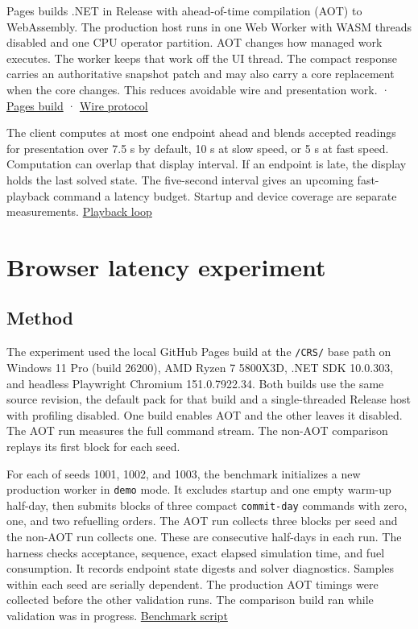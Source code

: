 \documentclass[11pt,letterpaper]{article}
\begin{document}
Pages builds .NET in Release with ahead-of-time compilation (AOT) to WebAssembly. The
production host runs in one Web Worker with WASM threads disabled and one CPU operator
partition. AOT changes how managed work executes. The worker keeps that work off the UI
thread. The compact response carries an authoritative snapshot patch and may also carry
a core replacement when the core changes. This reduces avoidable wire and presentation
work. \cite{ref-6} ·
\href{https://github.com/hkkho/CRS/blob/4341ae8881f5827988c3d8b1859aa9e8f13cd8a6/.github/workflows/deploy-candu-playtest.yml}{Pages
build} ·
\href{https://github.com/hkkho/CRS/blob/4341ae8881f5827988c3d8b1859aa9e8f13cd8a6/docs/spec/browser-playtest-protocol-v2.md}{Wire
protocol}

The client computes at most one endpoint ahead and blends accepted readings for
presentation over 7.5 s by default, 10 s at slow speed, or 5 s at fast speed.
Computation can overlap that display interval. If an endpoint is late, the display holds
the last solved state. The five-second interval gives an upcoming fast-playback command
a latency budget. Startup and device coverage are separate measurements.
\href{https://github.com/hkkho/CRS/blob/4341ae8881f5827988c3d8b1859aa9e8f13cd8a6/web/candu-playtest/src/DemoLoop.ts}{Playback
loop}

\section{Browser latency experiment}\label{sec:latency}

\subsection{Method}\label{method}

The experiment used the local GitHub Pages build at the \texttt{/CRS/} base path on
Windows 11 Pro (build 26200), AMD Ryzen 7 5800X3D, .NET SDK 10.0.303, and headless
Playwright Chromium 151.0.7922.34. Both builds use the same source revision, the default
pack for that build and a single-threaded Release host with profiling disabled. One build enables
AOT and the other leaves it disabled. The AOT run measures the full command stream. The
non-AOT comparison replays its first block for each seed.

For each of seeds 1001, 1002, and 1003, the benchmark initializes a new production
worker in \texttt{demo} mode. It excludes startup and one empty warm-up half-day, then
submits blocks of three compact \texttt{commit-day} commands with zero, one, and two
refuelling orders. The AOT run collects three blocks per seed and the non-AOT run
collects one. These are consecutive half-days in each run. The harness checks
acceptance, sequence, exact elapsed simulation time, and fuel consumption. It records
endpoint state digests and solver diagnostics. Samples within each seed are serially
dependent. The production AOT timings were collected before the other validation runs.
The comparison build ran while validation was in progress.
\href{https://github.com/hkkho/CRS/blob/main/web/candu-playtest/scripts/benchmark-demo-latency.mjs}{Benchmark
script}
\end{document}
